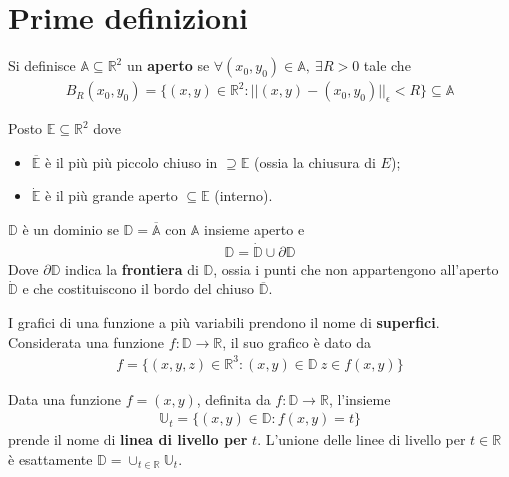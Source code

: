 \documentclass[a4paper, oneside]{book}
\begin{document}
\section{Prime definizioni}
\begin{definition}
    Si definisce $\mathbb{A} \subseteq \mathbb{R}^{2}$ un 
    \textbf{aperto} se  $\forall (x_0, y_0) \in \mathbb{A}, \  \exists R > 0$ tale che
\begin{gather*}
    B_R (x_0, y_0) = \{(x, y) \in \mathbb{R}^{2} : ||(x, y) - (x_0, y_0)||_{\epsilon} < R \} \subseteq  \mathbb{A}
\end{gather*}
\end{definition}
\begin{definition}
    Posto $\mathbb{E} \subseteq \mathbb{R}^{2}$ dove
    \begin{itemize}
        \item $\overline{\mathbb{E}}$ è il più più piccolo chiuso in $\supseteq \mathbb{E}$ (ossia la chiusura di $E$);
        \item  $ \dot{\mathbb{E}}$ è il più grande aperto $\subseteq \mathbb{E}$ (interno). 
    \end{itemize} 
\end{definition}
\begin{definition}
    $\mathbb{D}$ è un dominio se $\mathbb{D} = \overline{\mathbb{A}}$ con $\mathbb{A}$ insieme aperto e
    \begin{gather*}
        \mathbb{D} =\dot{\mathbb{D}} \cup \partial\mathbb{D}
    \end{gather*} 
    Dove $\partial \mathbb{D}$ indica la \textbf{frontiera} di $\mathbb{D}$, ossia i punti che non appartengono all'aperto $\dot{\mathbb{D}}$
    e che costituiscono il bordo del chiuso $\overline{ \mathbb{D}}$.
\end{definition} \noindent
I grafici di una funzione a più variabili prendono il nome di \textbf{superfici}. Considerata
una funzione $f: \mathbb{D} \to \mathbb{R}$, il suo grafico è dato da
\begin{align}
    f = \{(x, y, z) \in \mathbb{R}^{3} : (x, y) \in \mathbb{D} \ z \in f(x, y)\}
\end{align}
\begin{definition}
    Data una funzione $f = (x, y)$, definita da $f : \mathbb{D} \to \mathbb{R}$, l'insieme
    \begin{align}
        \mathbb{U}_t = \{(x, y) \in \mathbb{D} : f(x, y) = t\}
    \end{align}
    prende il nome di \textbf{linea di livello per} $t$. L'unione delle linee di livello 
    per $t \in \mathbb{R}$ è esattamente $\mathbb{D} = \cup_{t \in \mathbb{R}} \mathbb{U}_t $.
\end{definition}
\end{document}
